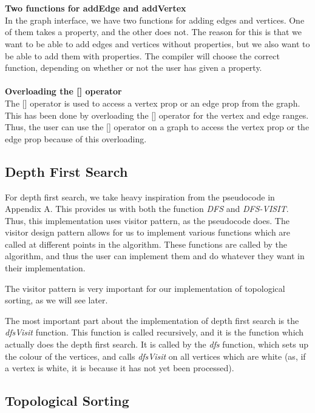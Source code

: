 \documentclass{article}
\begin{document}
\\\\
\noindent
\textbf{Two functions for addEdge and addVertex}\\
\noindent
In the graph interface, we have two functions for adding edges and vertices. One of them takes a property, and the other does not.
The reason for this is that we want to be able to add edges and vertices without properties, but we also want to be able to add them with properties.
The compiler will choose the correct function, depending on whether or not the user has given a property.
\\\\
\noindent
\textbf{Overloading the [] operator}\\
\noindent
The [] operator is used to access a vertex prop or an edge prop from the graph.
This has been done by overloading the [] operator for the vertex and edge ranges.
Thus, the user can use the [] operator on a graph to access the vertex prop or 
the edge prop because of this overloading.

\subsection{Depth First Search}
For depth first search, we take heavy inspiration from the pseudocode in Appendix A.
This provides us with both the function \textit{DFS} and \textit{DFS-VISIT}. 
Thus, this implementation uses visitor pattern, as the pseudocode does. 
The visitor design pattern allows for us to implement various functions 
which are called at different points in the algorithm. These functions 
are called by the algorithm, and thus the user can implement them and 
do whatever they want in their implementation.

The visitor pattern is very important for our implementation of topological
sorting, as we will see later.

The most important part about the implementation of depth first search is
the \textit{dfsVisit} function. This function is called recursively, and
it is the function which actually does the depth first search. It is called
by the \textit{dfs} function, which sets up the colour of the vertices, and
calls \textit{dfsVisit} on all vertices which are white (as, if a vertex is 
white, it is because it has not yet been processed).


\subsection{Topological Sorting}
\end{document}

